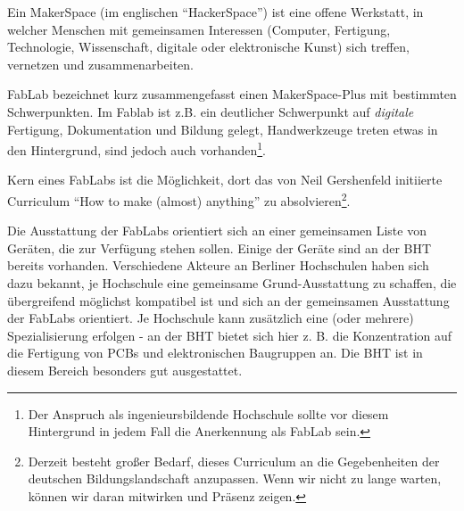 \documentclass[parskip=half,headsepline,footsepline,titlepage]{scrartcl}
\begin{document}
Ein MakerSpace (im englischen “HackerSpace”) ist eine offene Werkstatt, in welcher Menschen mit gemeinsamen Interessen (Computer, Fertigung, Technologie, Wissenschaft, digitale oder elektronische Kunst) sich treffen, vernetzen und zusammenarbeiten.

FabLab bezeichnet kurz zusammengefasst einen MakerSpace-Plus mit bestimmten Schwerpunkten. Im Fablab ist z.B. ein deutlicher Schwerpunkt auf \emph{digitale} Fertigung, Dokumentation und Bildung gelegt, Handwerkzeuge treten etwas in den Hintergrund, sind jedoch auch vorhanden\footnote{Der Anspruch als ingenieursbildende Hochschule sollte vor diesem Hintergrund in jedem Fall die Anerkennung als FabLab sein.}.

Kern eines FabLabs ist die Möglichkeit, dort das von Neil Gershenfeld initiierte Curriculum “How to make (almost) anything” zu absolvieren\footnote{Derzeit besteht großer Bedarf, dieses Curriculum an die Gegebenheiten der deutschen Bildungslandschaft anzupassen. Wenn wir nicht zu lange warten, können wir daran mitwirken und Präsenz zeigen.}. 

Die Ausstattung der FabLabs orientiert sich an einer gemeinsamen Liste von Geräten, die zur Verfügung stehen sollen. Einige der Geräte sind an der BHT bereits vorhanden.
Verschiedene Akteure an Berliner Hochschulen haben sich dazu bekannt, je Hochschule eine gemeinsame Grund-Ausstattung zu schaffen, die übergreifend möglichst kompatibel ist und sich an der gemeinsamen Ausstattung der FabLabs orientiert. Je Hochschule kann zusätzlich eine (oder mehrere) Spezialisierung erfolgen - an der BHT bietet sich hier z. B. die Konzentration auf die Fertigung von PCBs und elektronischen Baugruppen an. Die BHT ist in diesem Bereich besonders gut ausgestattet.
\end{document}
